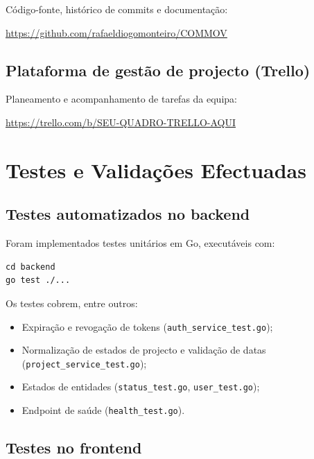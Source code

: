 \documentclass[12pt,a4paper]{article}
\begin{document}
Código-fonte, histórico de commits e documentação:

\begin{center}
\url{https://github.com/rafaeldiogomonteiro/COMMOV}
\end{center}

\subsection{Plataforma de gestão de projecto (Trello)}

Planeamento e acompanhamento de tarefas da equipa:

\begin{center}
\url{https://trello.com/b/SEU-QUADRO-TRELLO-AQUI}
\end{center}



\section{Testes e Validações Efectuadas}

\subsection{Testes automatizados no backend}

Foram implementados testes unitários em Go, executáveis com:

\begin{lstlisting}
cd backend
go test ./...
\end{lstlisting}

Os testes cobrem, entre outros:

\begin{itemize}[leftmargin=*]
    \item Expiração e revogação de tokens (\texttt{auth\_service\_test.go});
    \item Normalização de estados de projecto e validação de datas (\texttt{project\_service\_test.go});
    \item Estados de entidades (\texttt{status\_test.go}, \texttt{user\_test.go});
    \item Endpoint de saúde (\texttt{health\_test.go}).
\end{itemize}

\subsection{Testes no frontend}
\end{document}

